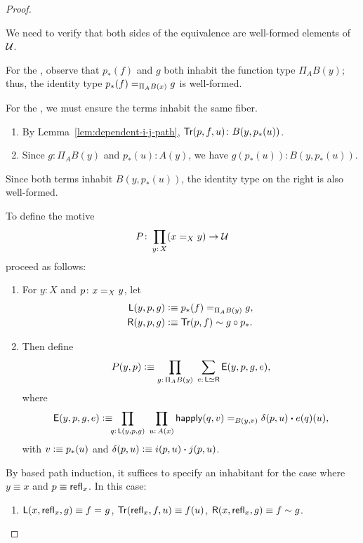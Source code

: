 \begin{proof}${}$
    \begin{description}[font=\normalfont\scshape]
        \item[Type verification:] We need to verify that both sides of the equivalence are well-formed elements of\/ $\mathcal U$.
        
        For the \lhs, observe that $p_*(f)$ and $g$ both inhabit the function type $\Pi_AB(y)$; thus, the identity type $p_*(f)\mathrel{=_{\Pi_AB(x)}}g$ is well-formed.

        For the \rhs, we must ensure the terms inhabit the same fiber.
        \begin{enumerate}[-]
            \item By Lemma~\ref{lem:dependent-i-j-path}, $\fun{Tr}(p,f,u) \colon B(y, p_*(u))$.
            
            \item Since $g\colon \Pi_AB(y)$ and $p_*(u)\colon A(y)$, we have $g(p_*(u)) \colon B(y, p_*(u))$.
        \end{enumerate}
        Since both terms inhabit $B(y, p_*(u))$, the identity type on the right is also well-formed.
        
        \item[Inhabitation:] To define the motive
        \[
            P\colon\prod_{y\colon X}(x\eq Xy)\to\univ
        \]
        proceed as follows:
        \begin{enumerate}[-]
            \item For $y\colon X$ and $p\colon x\eq Xy$, let
            \begin{align*}
                \mathsf{L}(y,p,g)
                    &\mathrel{\vcentcolon}\equiv p_*(f)\mathrel{=_{\Pi_AB(y)}}g,\\
                \mathsf{R}(y,p,g)
                    &\mathrel{\vcentcolon}\equiv\mathsf{Tr}(p,f)\sim g\circ p_*.
            \end{align*}
    
            \item Then define
            \[
                P(y,p)\defeq\prod_{g\colon\Pi_AB(y)}
                    \;\sum_{e\colon\fun L\simeq\fun R}
                    \fun E(y,p,g,e),
            \]
            where
            \[
                \fun E(y,p,g,e)\defeq\!\!\!
                    \prod_{q\colon\fun L(y,p,g)}
                    \;\prod_{u\colon A(x)}
                        \fun{happly}(q,v)
                        \eq{B(y,v)}
                        \delta(p,u)\ct e(q)(u),
            \]
            with $v\mathrel{\vcentcolon}\equiv p_*(u)$ and $\delta(p,u)\mathrel{\vcentcolon}\equiv i(p,u)\mathbin{\boldsymbol{\cdot}} j(p,u)$.
        \end{enumerate}
        By based path induction, it suffices to specify an inhabitant for the case where $y\equiv x$ and $p\equiv\mathsf{refl}_x$. In this case:
        \begin{enumerate}[-]
            \item $\mathsf{L}(x,\mathsf{refl}_x,g)\equiv f\mathrel{=_{}}g$,  $\mathsf{Tr}(\mathsf{refl}_x,f,u)\equiv f(u)$, $\mathsf{R}(x,\mathsf{refl}_x,g)\equiv f\sim g$.
    

\end{enumerate}
\end{description}
\end{proof}
